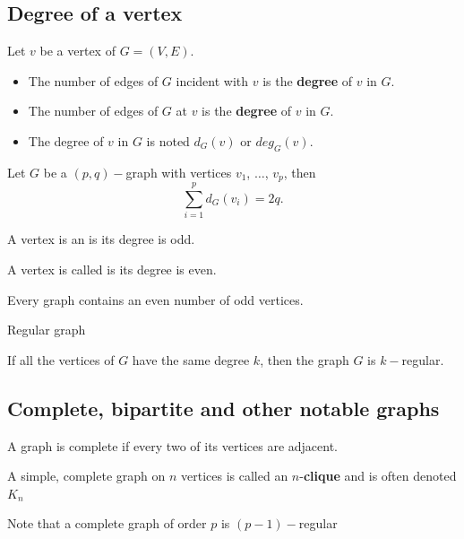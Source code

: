 \documentclass[aspectratio=169]{beamer}
\begin{document}
\subsection{Degree of a vertex}

\begin{frame}
	\begin{definition}
	Let $v$ be a vertex of $G=(V,E)$.
	\begin{itemize}
	\item The number of edges of $G$ incident with $v$ is the {\bf degree} of $v$ in $G$.
	\item The number of edges of $G$ at $v$ is the {\bf degree} of $v$ in $G$.
	\item The degree of $v$ in $G$ is noted $d_G(v)$ or $deg_G(v)$.
	\end{itemize}
	\end{definition}
	\begin{theorem}
	Let $G$ be a $(p,q)-$graph with vertices $v_1$, $\dots$, $v_p$, then
	\[
		\sum_{i=1}^{p}d_G(v_i)=2q.
	\]
	\end{theorem}
\end{frame}

\begin{frame}
\begin{definition}
A vertex is an  is its degree is odd.
\end{definition}
\begin{definition}
A vertex is called  is its degree is even.
\end{definition}
\begin{theorem}
Every graph contains an even number of odd vertices.
\end{theorem}
\end{frame}

\begin{frame}{Regular graph}
\begin{definition}
	If all the vertices of $G$ have the same degree $k$, then the graph $G$ is $k-$regular.
\end{definition}
\end{frame}



\subsection{Complete, bipartite and other notable graphs}
\begin{frame}
\begin{definition}
A graph is complete if every two of its vertices are adjacent.
\end{definition}
\begin{definition}[$n$-clique]
	A simple, complete graph on $n$ vertices is called an $n$-\textbf{clique} and is often denoted $K_n$
\end{definition}
Note that a complete graph of order $p$ is $(p-1)-$regular
\end{frame}
\end{document}
